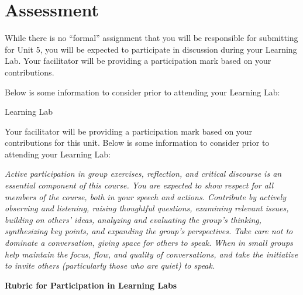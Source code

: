 \documentclass[
]{book}
\begin{document}
\hypertarget{assessment-4}{%
\section*{Assessment}\label{assessment-4}}

\begin{assessment}
While there is no ``formal'' assignment that you will be responsible for submitting for Unit 5, you will be expected to participate in discussion during your Learning Lab. Your facilitator will be providing a participation mark based on your contributions.

Below is some information to consider prior to attending your Learning Lab:

{Learning Lab}

Your facilitator will be providing a participation mark based on your contributions for this unit. Below is some information to consider prior to attending your Learning Lab:

\emph{Active participation in group exercises, reflection, and critical discourse is an essential component of this course. You are expected to show respect for all members of the course, both in your speech and actions. Contribute by actively observing and listening, raising thoughtful questions, examining relevant issues, building on others' ideas, analyzing and evaluating the group's thinking, synthesizing key points, and expanding the group's perspectives. Take care not to dominate a conversation, giving space for others to speak. When in small groups help maintain the focus, flow, and quality of conversations, and take the initiative to invite others (particularly those who are quiet) to speak.}

\textbf{Rubric for Participation in Learning Labs}


\end{assessment}
\end{document}
